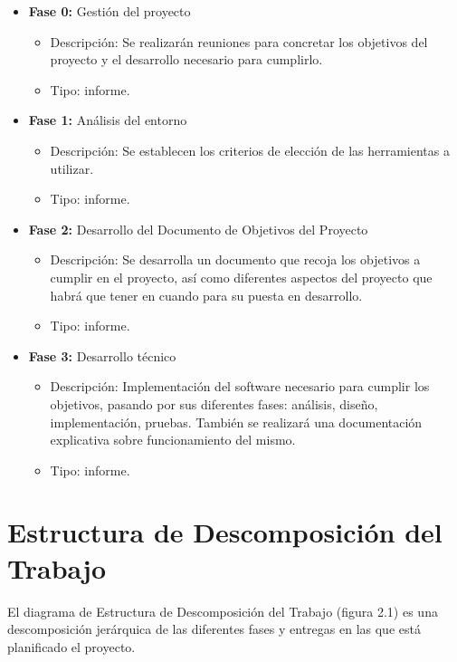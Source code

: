 \begin{itemize}
  \item \textbf{Fase 0:} Gestión del proyecto
  \begin{itemize}
    \item Descripción: Se realizarán reuniones para concretar los objetivos del proyecto y el desarrollo necesario para 
    cumplirlo.
    \item Tipo: informe.
  \end{itemize}
  \item \textbf{Fase 1:} Análisis del entorno
  \begin{itemize}
    \item Descripción: Se establecen los criterios de elección de las herramientas a utilizar.
    \item Tipo: informe.
  \end{itemize}
  \item \textbf{Fase 2:} Desarrollo del Documento de Objetivos del Proyecto
  \begin{itemize}
    \item Descripción: Se desarrolla un documento que recoja los objetivos a cumplir en el proyecto, así como diferentes
    aspectos del proyecto que habrá que tener en cuando para su puesta en desarrollo.
    \item Tipo: informe.
  \end{itemize}
  \item \textbf{Fase 3:} Desarrollo técnico
  \begin{itemize}
    \item Descripción: Implementación del software necesario para cumplir los objetivos, pasando por sus diferentes fases: 
    análisis, diseño, implementación, pruebas. También se realizará una documentación explicativa sobre funcionamiento del 
    mismo.
    \item Tipo: informe.
  \end{itemize}
\end{itemize}

\section{Estructura de Descomposición del Trabajo}

El diagrama de Estructura de Descomposición del Trabajo (figura 2.1) es una descomposición jerárquica de las diferentes fases y 
entregas en las que está planificado el proyecto.

